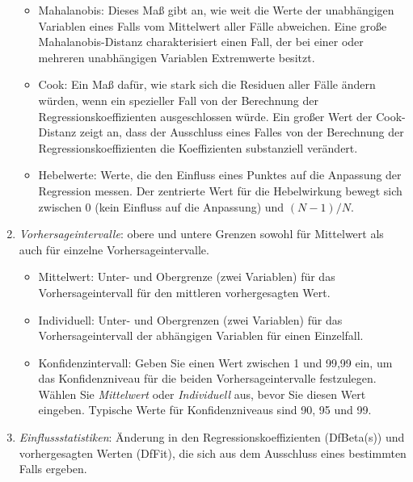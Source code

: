 \documentclass[]{article}
\providecommand{\tightlist}{%
  \setlength{\itemsep}{0pt}\setlength{\parskip}{0pt}}
\begin{document}
\begin{enumerate}
  \begin{itemize}
  \tightlist
  \item
    Mahalanobis: Dieses Maß gibt an, wie weit die Werte der unabhängigen
    Variablen eines Falls vom Mittelwert aller Fälle abweichen. Eine
    große Mahalanobis-Distanz charakterisiert einen Fall, der bei einer
    oder mehreren unabhängigen Variablen Extremwerte besitzt.
  \item
    Cook: Ein Maß dafür, wie stark sich die Residuen aller Fälle ändern
    würden, wenn ein spezieller Fall von der Berechnung der
    Regressionskoeffizienten ausgeschlossen würde. Ein großer Wert der
    Cook-Distanz zeigt an, dass der Ausschluss eines Falles von der
    Berechnung der Regressionskoeffizienten die Koeffizienten
    substanziell verändert.
  \item
    Hebelwerte: Werte, die den Einfluss eines Punktes auf die Anpassung
    der Regression messen. Der zentrierte Wert für die Hebelwirkung
    bewegt sich zwischen 0 (kein Einfluss auf die Anpassung) und
    \((N-1)/N\).
  \end{itemize}
\item
  \emph{Vorhersageintervalle}: obere und untere Grenzen sowohl für
  Mittelwert als auch für einzelne Vorhersageintervalle.

  \begin{itemize}
  \tightlist
  \item
    Mittelwert: Unter- und Obergrenze (zwei Variablen) für das
    Vorhersageintervall für den mittleren vorhergesagten Wert.
  \item
    Individuell: Unter- und Obergrenzen (zwei Variablen) für das
    Vorhersageintervall der abhängigen Variablen für einen Einzelfall.
  \item
    Konfidenzintervall: Geben Sie einen Wert zwischen 1 und 99,99 ein,
    um das Konfidenzniveau für die beiden Vorhersageintervalle
    festzulegen. Wählen Sie \emph{Mittelwert} oder \emph{Individuell}
    aus, bevor Sie diesen Wert eingeben. Typische Werte für
    Konfidenzniveaus sind 90, 95 und 99.
  \end{itemize}
\item
  \emph{Einflussstatistiken}: Änderung in den Regressionskoeffizienten
  (DfBeta(s)) und vorhergesagten Werten (DfFit), die sich aus dem
  Ausschluss eines bestimmten Falls ergeben.


\end{enumerate}
\end{document}
